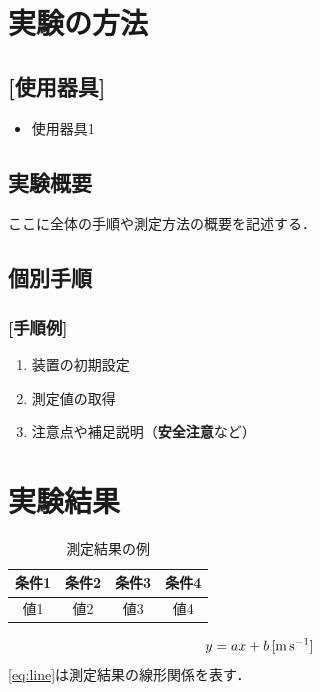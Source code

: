 \documentclass[lualatex,ja=standard]{bxjsarticle}
\begin{document}
\section{実験の方法}

\subsection*{[使用器具]}

\begin{itemize}
  \item 使用器具1
\end{itemize}

\subsection{実験概要}
ここに全体の手順や測定方法の概要を記述する．

\subsection{個別手順}
\subsubsection*{[手順例]}
\begin{enumerate}
  \item 装置の初期設定
  \item 測定値の取得
  \item 注意点や補足説明（\textbf{安全注意}など）
\end{enumerate}

\section{実験結果}

\begin{table}[htbp]
  \centering
  \caption{測定結果の例}
  \label{tab:example}
  \begin{tabular}{cccc}
    \toprule
    条件1 & 条件2 & 条件3 & 条件4 \\
    \midrule
    値1 & 値2 & 値3 & 値4 \\
    \bottomrule
  \end{tabular}
\end{table}

\begin{equation}
  y = a x + b \,\text{[\si{\meter\per\second}]}
  \label{eq:line}
\end{equation}
\autoref{eq:line}は測定結果の線形関係を表す．
\end{document}
